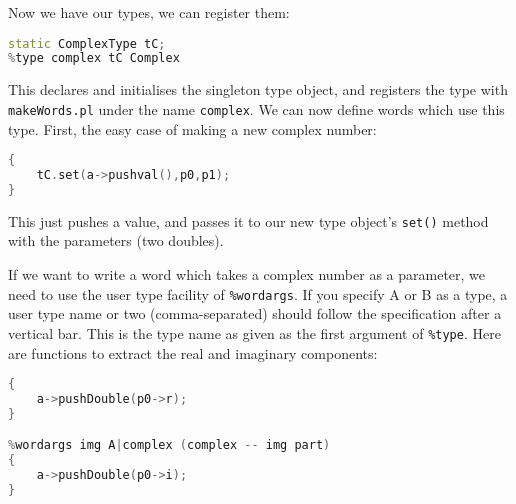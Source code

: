 Now we have our types, we can register them:
\begin{lstlisting}[language=c++]
static ComplexType tC;
%type complex tC Complex
\end{lstlisting}
This declares and initialises the singleton type object,
and registers the type with \texttt{makeWords.pl} under the name
\texttt{complex}.
We can now define words which use this type. First, the easy case
of making a new complex number:
\begin{lstlisting}[language=c++]
%wordargs complex dd (r i -- complex)
{
    tC.set(a->pushval(),p0,p1);
}
\end{lstlisting}
This just pushes a value, and passes it to our new type object's
\texttt{set()} method with the parameters (two doubles).

If we want to write a word which takes a complex number as a parameter,
we need to use the user type facility of \texttt{\%wordargs}. If you
specify A or B as a type, a user type name or two (comma-separated) should
follow the specification after a vertical bar. This is the type
name as given as the first argument of \texttt{\%type}. Here are
functions to extract the real and imaginary components:
\begin{lstlisting}[language=c++]
%wordargs real A|complex (complex -- real part)
{
    a->pushDouble(p0->r);
}

%wordargs img A|complex (complex -- img part)
{
    a->pushDouble(p0->i);
}
\end{lstlisting}

\clearpage
